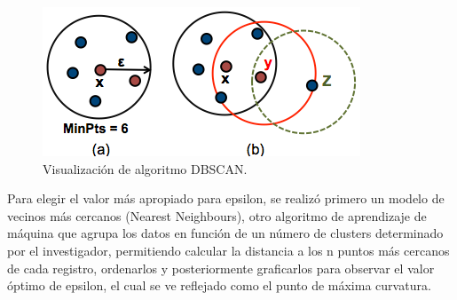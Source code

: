 \documentclass[
]{article}
\begin{document}
\begin{figure}
\centering
\includegraphics{./dbscan-principle.png}
\caption{Visualización de algoritmo DBSCAN.}
\end{figure}

Para elegir el valor más apropiado para epsilon, se realizó primero un
modelo de vecinos más cercanos (Nearest Neighbours), otro algoritmo de
aprendizaje de máquina que agrupa los datos en función de un número de
clusters determinado por el investigador, permitiendo calcular la
distancia a los n puntos más cercanos de cada registro, ordenarlos y
posteriormente graficarlos para observar el valor óptimo de epsilon, el
cual se ve reflejado como el punto de máxima curvatura.
\end{document}
